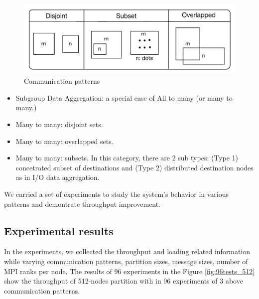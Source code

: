 \begin{figure}[!htb]
\vspace{-0.1in}
\centering
\includegraphics[scale=0.55]{figures/patterns.pdf}
\vspace{-0.1in}
\caption{Communication patterns}
\vspace{-0.1in}
\label{fig:patterns}
\end{figure}

\begin{itemize}
\item Subgroup Data Aggregation: a special case of All to many (or many to many.)
\item Many to many: disjoint sets.
\item Many to many: overlapped sets.
\item Many to many: subsets. In this category, there are 2 sub types: (Type 1) concetrated subset of destinations and (Type 2) distributed destination nodes as in I/O data aggregation.
\end{itemize}

We carried a set of experiments to study the system's behavior in various patterns and demontrate throughput improvement.

\subsection{Experimental results}

In the experiments, we collected the throughput and loading related information while varying communication patterns, partition sizes, message sizes, number of MPI ranks per node.
The results of 96 experiments in the Figure \ref{fig:96tests_512} show the throughput of 512-nodes partition with in 96 experiments of 3 above communication patterns.

